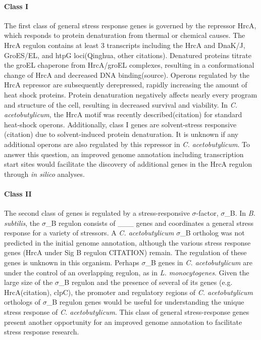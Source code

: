 \paragraph{Class I}
The first class of general stress response genes is governed by the repressor HrcA, which responds to protein denaturation from thermal or chemical causes. The HrcA regulon contains at least 3 transcripts including the HrcA and DnaK/J, GroES/EL, and htpG loci(Qinghua, other citations). Denatured proteins titrate the groEL chaperone from HrcA/groEL complexes, resulting in a conformational change of HrcA and decreased DNA binding(source). Operons regulated by the HrcA repressor are subsequently derepressed, rapidly increasing the amount of heat shock proteins. Protein denaturation negatively affects nearly every program and structure of the cell, resulting in decreased survival and viability. In \textit{C. acetobutylicum}, the HrcA motif was recently described(citation) for standard heat-shock operons. Additionally, class I genes are solvent-stress responsive (citation) due to solvent-induced protein denaturation. It is unknown if any additional operons are also regulated by this repressor in \textit{C. acetobutylicum}. To answer this question, an improved genome annotation including transcription start sites would facilitate the discovery of additional genes in the HrcA regulon through \textit{in silico} analyses.

\paragraph{Class II}
The second class of genes is regulated by a stress-responsive $\sigma$-factor, $\sigma$_{B}. In \textit{B. subtilis}, the $\sigma$_B regulon consists of ___ genes and coordinates a general stress response for a variety of stressors. A \textit{C. acetobutylicum} $\sigma$_B ortholog was not predicted in the initial genome annotation, although the various stress response genes (HrcA under Sig B regulon CITATION) remain. The regulation of these genes is unknown in this organism. Perhaps $\sigma$_{B} genes in \textit{C. acetobutylicum} are under the control of an overlapping regulon, as in \textit{L. monocytogenes}. Given the large size of the $\sigma$_B regulon and the presence of several of its genes (e.g. HrcA(citation), clpC), the promoter and regulatory regions of \textit{C. acetobutylicum} orthologs of $\sigma$_{B} regulon genes would be useful for understanding the unique stress response of \textit{C. acetobutylicum}. This class of general stress-response genes present another opportunity for an improved genome annotation to facilitate stress response research.


